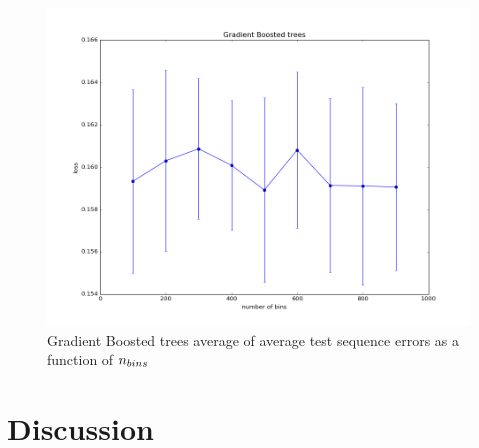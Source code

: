 \documentclass[twoside]{article}
\begin{document}
\begin{figure}[!ht]
  \centering  
  \includegraphics[width=0.6\linewidth]{xgb_average_loss_over_bins}
  \caption{Gradient Boosted trees average of average test sequence errors as a
    function of $\protect n_{bins}$}
  \label{fig:xgb_average_loss_over_bins}
\end{figure}

\section{Discussion}

\medskip



\end{document}
